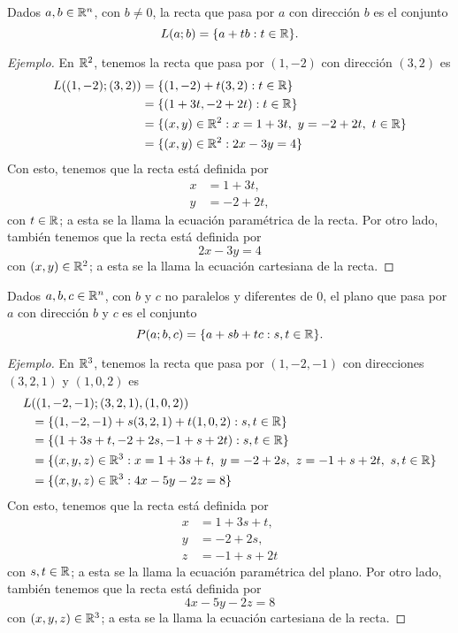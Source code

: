 \documentclass[a4,11pt]{aleph-notas}
\begin{document}
\begin{defi}[Recta de $\R^n$]
    Dados $a,b\in\mathbb{R}^n$, con $b\neq0$, la recta que pasa por $a$ con dirección $b$ es el conjunto
    \[
        L(a;b)=\{a+t b:t\in\mathbb{R}\}.
    \]
\end{defi}

\begin{proof}[Ejemplo]
    En $\mathbb{R}^2$, tenemos la recta que pasa por $(1,-2)$ con dirección $(3,2)$ es
    \begin{align*}
        L((1,-2);(3,2)) 
            & = \{(1,-2)+t(3,2):t \in\mathbb{R}\} \\
            & = \{(1+3t ,-2+2t ): t \in\mathbb{R}\} \\
            & = \{(x,y)\in\mathbb{R}^2: x = 1+3t ,\ y=-2+2t ,\ t \in\mathbb{R}\} \\
            & = \{(x,y)\in\mathbb{R}^2: 2x-3y=4\}
    \end{align*}
    Con esto, tenemos que la recta está definida por
    \begin{align*}
        x& = 1+3t ,\\
        y& = -2+2t ,
    \end{align*}
    con $t \in \mathbb{R}$; a esta se la llama la ecuación paramétrica de la recta. Por otro lado, también tenemos que la recta está definida por 
    \[
        2x-3y=4
    \]
    con $(x,y)\in\mathbb{R}^2$; a esta se la llama la ecuación cartesiana de la recta.
\end{proof}

\begin{defi}[Plano de $\R^n$]
    Dados $a,b,c\in\mathbb{R}^n$, con $b$ y $c$ no paralelos y diferentes de $0$, el plano que pasa por $a$ con dirección $b$ y $c$ es el conjunto
    \[
        P(a;b,c)=\{a+s  b+t c:s ,t \in\mathbb{R}\}.
    \]
\end{defi}

\begin{proof}[Ejemplo]
    En $\mathbb{R}^3$, tenemos la recta que pasa por $(1,-2,-1)$ con direcciones $(3,2,1)$ y $(1,0,2)$ es
    \begin{align*}
        L&((1,-2,-1);(3,2,1),(1,0,2)) \\
            & = \{(1,-2,-1)+s (3,2,1) + t (1,0,2) :s ,t \in\mathbb{R}\} \\
            & = \{(1+3s +t ,-2+2s ,-1+s +2t ): s ,t \in\mathbb{R}\} \\
            & = \{(x,y,z)\in\mathbb{R}^3: x = 1+3s +t ,\ y=-2+2s ,\ z=-1+s +2t ,\ s ,t \in\mathbb{R}\} \\
            & = \{(x,y,z)\in\mathbb{R}^3: 4x-5y-2z=8\}
    \end{align*}
    Con esto, tenemos que la recta está definida por
    \begin{align*}
        x& = 1+3s +t ,\\
        y& = -2+2s ,\\
        z& = -1+s +2t 
    \end{align*}
    con $s ,t \in \mathbb{R}$; a esta se la llama la ecuación paramétrica del plano. Por otro lado, también tenemos que la recta está definida por 
    \[
        4x-5y-2z=8
    \]
    con $(x,y,z)\in\mathbb{R}^3$; a esta se la llama la ecuación cartesiana de la recta.
\end{proof}
\end{document}
